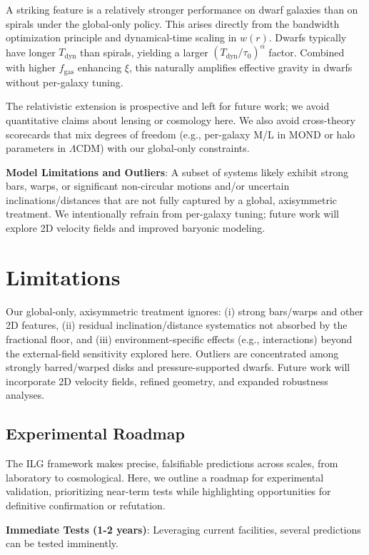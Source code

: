 \documentclass[usenatbib]{mnras}
\begin{document}
A striking feature is a relatively stronger performance on dwarf galaxies than on spirals under the global-only policy. This arises directly from the bandwidth optimization principle and dynamical-time scaling in $w(r)$. Dwarfs typically have longer $T_\mathrm{dyn}$ than spirals, yielding a larger $(T_\mathrm{dyn}/\tau_0)^\alpha$ factor. Combined with higher $f_\mathrm{gas}$ enhancing $\xi$, this naturally amplifies effective gravity in dwarfs without per-galaxy tuning.

The relativistic extension is prospective and left for future work; we avoid quantitative claims about lensing or cosmology here. We also avoid cross-theory scorecards that mix degrees of freedom (e.g., per-galaxy M/L in MOND or halo parameters in $\Lambda$CDM) with our global-only constraints.

\textbf{Model Limitations and Outliers}: A subset of systems likely exhibit strong bars, warps, or significant non-circular motions and/or uncertain inclinations/distances that are not fully captured by a global, axisymmetric treatment. We intentionally refrain from per-galaxy tuning; future work will explore 2D velocity fields and improved baryonic modeling.

\section{Limitations}
\noindent Our global-only, axisymmetric treatment ignores: (i) strong bars/warps and other 2D features, (ii) residual inclination/distance systematics not absorbed by the fractional floor, and (iii) environment-specific effects (e.g., interactions) beyond the external-field sensitivity explored here. Outliers are concentrated among strongly barred/warped disks and pressure-supported dwarfs. Future work will incorporate 2D velocity fields, refined geometry, and expanded robustness analyses.

\subsection{Experimental Roadmap}

The ILG framework makes precise, falsifiable predictions across scales, from laboratory to cosmological. Here, we outline a roadmap for experimental validation, prioritizing near-term tests while highlighting opportunities for definitive confirmation or refutation.

\textbf{Immediate Tests (1-2 years)}: Leveraging current facilities, several predictions can be tested imminently.
\end{document}
